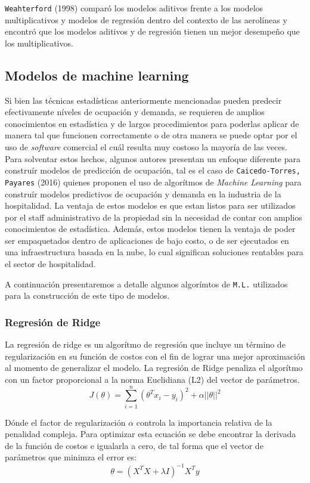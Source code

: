 {\texttt{Weahterford} (1998) comparó los modelos aditivos frente a los modelos multiplicativos y modelos de regresión dentro del contexto de las aerolíneas y encontró que los modelos aditivos y de regresión tienen un mejor desempeño que los multiplicativos.

\subsection*{Modelos de machine learning}

Si bien las técnicas estadísticas anteriormente mencionadas pueden predecir efectivamente níveles de ocupación y demanda, se requieren de amplios conocimientos en estadística y de largos procedimientos para poderlas aplicar de manera tal que funcionen correctamente o de otra manera se puede optar por el uso de \emph{software} comercial el cuál resulta muy costoso la mayoría de las veces. Para solventar estos hechos, algunos autores presentan un enfoque diferente para construír modelos de predicción de ocupación, tal es el caso de \texttt{Caicedo-Torres, Payares} (2016) quienes proponen el uso de algorítmos de \emph{Machine Learning} para construír modelos predictivos de ocupación y demanda en la industria de la hospitalidad. La ventaja de estos modelos es que estan listos para ser utilizados por el staff administrativo de la propiedad  sin la necesidad de contar con amplios conocimientos de estadística. Además, estos modelos tienen la ventaja de poder ser empaquetados dentro de aplicaciones de bajo costo, o de ser ejecutados en una infraestructura basada en la nube, lo cual significan soluciones rentables para el sector de hospitalidad.

A continuación presentaremos a detalle algunos algorímtos de \texttt{M.L.} utilizados para la construcción de este tipo de modelos.

\subsubsection*{Regresión de Ridge}

La regresión de ridge es un algorítmo de regresión que incluye un término de regularización en su función de costos con el fin de lograr una mejor aproximación al momento de generalizar el modelo. La regresión de Ridge penaliza el algorítmo con un factor proporcional a la norma Euclidiana (L2) del vector de parámetros. $$J(\theta)=\sum_{i=1}^{n} (\theta^Tx_i - y_i)^2 + \alpha||\theta||^2$$

Dónde el factor de regularización $\alpha$ controla la importancia relativa de la penalidad compleja. Para optimizar esta ecuación se debe encontrar la derivada de la función de costos e igualarla a cero, de tal forma que el vector de parámetros que minimza el error es: $$\theta = (X^TX+\lambda I)^{-1} X^T y$$

}
